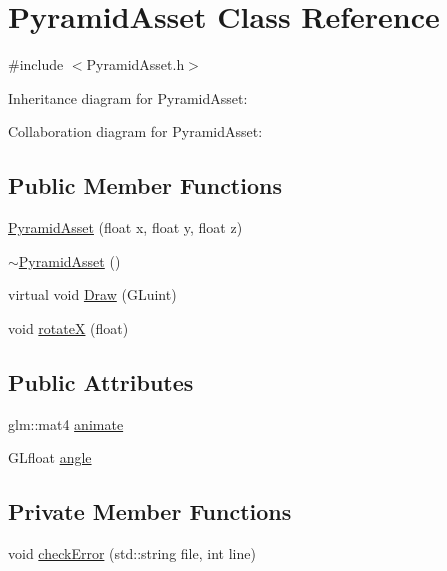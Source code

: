 \hypertarget{class_pyramid_asset}{}\section{Pyramid\+Asset Class Reference}
\label{class_pyramid_asset}


{\ttfamily \#include $<$Pyramid\+Asset.\+h$>$}



Inheritance diagram for Pyramid\+Asset\+:


Collaboration diagram for Pyramid\+Asset\+:
\subsection*{Public Member Functions}
\begin{DoxyCompactItemize}
\item 
\hyperlink{class_pyramid_asset_a5302c1b5d8686715723db6442683e91b}{Pyramid\+Asset} (float x, float y, float z)
\item 
\hyperlink{class_pyramid_asset_afb388a196f43a3808b2d4f6fdb89ee84}{$\sim$\+Pyramid\+Asset} ()
\item 
virtual void \hyperlink{class_pyramid_asset_aaea45da4956d79ec9ab96e9d0ccef3fe}{Draw} (G\+Luint)
\item 
void \hyperlink{class_pyramid_asset_a7183a92811f5ca114b433e21a72c45bf}{rotate\+X} (float)
\end{DoxyCompactItemize}
\subsection*{Public Attributes}
\begin{DoxyCompactItemize}
\item 
glm\+::mat4 \hyperlink{class_pyramid_asset_aec28310c03808b12dab07d48bd971d1b}{animate}
\item 
G\+Lfloat \hyperlink{class_pyramid_asset_afc05567a64280648f735bf33da5ca345}{angle}
\end{DoxyCompactItemize}
\subsection*{Private Member Functions}
\begin{DoxyCompactItemize}
\item 
void \hyperlink{class_pyramid_asset_a34350044042e0098446dc9e0a260cb70}{check\+Error} (std\+::string file, int line)
\end{DoxyCompactItemize}
